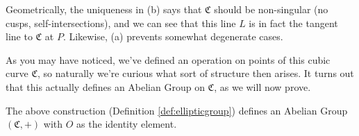 Geometrically, the uniqueness in (b) says that $\mathfrak{C}$ should be non-singular (no cusps, self-intersections),
and we can see that this line $L$ is in fact the tangent line to $\mathfrak{C}$ at $P$.
Likewise, (a) prevents somewhat degenerate cases.

As you may have noticed, we've defined an operation on points of this
cubic curve $\mathfrak{C}$, so naturally we're curious what sort of structure then
arises. It turns out that this actually defines an Abelian Group on $\mathfrak{C}$,
as we will now prove.

\begin{theorem}
The above construction (Definition \ref{def:ellipticgroup}) defines
an Abelian Group $(\mathfrak{C},+)$ with $O$ as the identity element.
\end{theorem}

